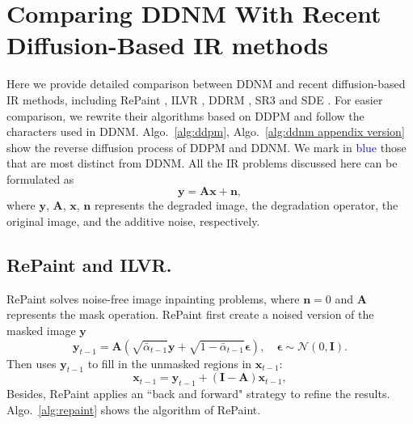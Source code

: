 \documentclass{article} \usepackage{iclr2023_conference,times}
\begin{document}
\newpage


\newpage

\section{Comparing DDNM With Recent Diffusion-Based IR methods}
\label{ap:special cases}
Here we provide detailed comparison between DDNM and recent diffusion-based IR methods, including RePaint \citep{lugmayr2022repaint}, ILVR \citep{choi2021ilvr}, DDRM \citep{kawar2022denoising}, SR3 \citep{sr3} and SDE \citep{song2020score}. For easier comparison, we rewrite their algorithms based on DDPM \citep{ho2020denoising} and follow the characters used in DDNM. Algo.~\ref{alg:ddpm}, Algo.~\ref{alg:ddnm appendix version} show the reverse diffusion process of DDPM and DDNM. We mark in \textcolor{blue}{blue} those that are most distinct from DDNM.
All the IR problems discussed here can be formulated as
\begin{equation}
    \mathbf{y}= \mathbf{A}\mathbf{x} + \mathbf{n},
    \label{eq:general IR formulation}
\end{equation}
where $\mathbf{y}$, $\mathbf{A}$, $\mathbf{x}$, $\mathbf{n}$ represents the degraded image, the degradation operator, the original image, and the additive noise, respectively.

\subsection{RePaint and ILVR.}
RePaint \citep{lugmayr2022repaint} solves noise-free image inpainting problems, where $\mathbf{n}=0$ and $\mathbf{A}$ represents the mask operation. RePaint first create a noised version of the masked image $\mathbf{y}$
\begin{equation}
    \mathbf{y}_{t-1} =\mathbf{A}( \sqrt{\bar{\alpha}_{t-1}}\mathbf{y}+\sqrt{1-\bar{\alpha}_{t-1}}\boldsymbol{\epsilon}), \quad \boldsymbol{\epsilon}\sim \mathcal{N}(0,\mathbf{I}).
    \label{eq:repaint yt-1}
\end{equation}
Then uses $\mathbf{y}_{t-1}$ to fill in the unmasked regions in $\mathbf{x}_{t-1}$:
\begin{equation}
    \mathbf{x}_{t-1} = \mathbf{y}_{t-1} + (\mathbf{I} -\mathbf{A})\mathbf{x}_{t-1},
    \label{eq:repaint xt-1}
\end{equation}
Besides, RePaint applies an ``back and forward" strategy to refine the results. Algo.~\ref{alg:repaint} shows the algorithm of RePaint.
\end{document}
